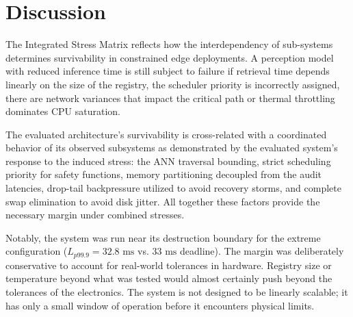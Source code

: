 \documentclass[conference]{IEEEtran}
\begin{document}
\section{Discussion}

The Integrated Stress Matrix reflects how the interdependency of sub-systems determines survivability in constrained edge deployments. A perception model with reduced inference time is still subject to failure if retrieval time depends linearly on the size of the registry, the scheduler priority is incorrectly assigned, there are network variances that impact the critical path or thermal throttling dominates CPU saturation.

The evaluated architecture's survivability is cross-related with a coordinated behavior of its observed subsystems as demonstrated by the evaluated system's response to the induced stress: the ANN traversal bounding, strict scheduling priority for safety functions, memory partitioning decoupled from the audit latencies, drop-tail backpressure utilized to avoid recovery storms, and complete swap elimination to avoid disk jitter. All together these factors provide the necessary margin under combined stresses.

Notably, the system was run near its destruction boundary for the extreme configuration ($L_{p99.9} = 32.8\text{ ms}$ vs. $33\text{ ms}$ deadline). The margin was deliberately conservative to account for real-world tolerances in hardware. Registry size or temperature beyond what was tested would almost certainly push beyond the tolerances of the electronics. The system is not designed to be linearly scalable; it has only a small window of operation before it encounters physical limits.
\end{document}
